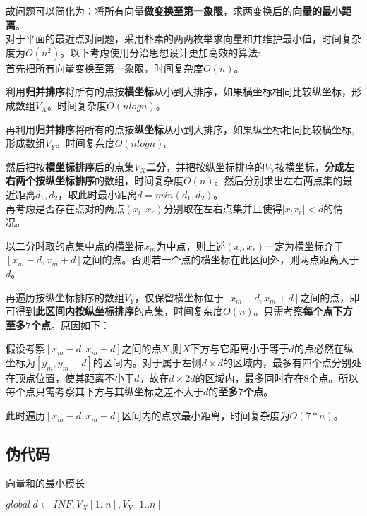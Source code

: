 \documentclass{article}
\begin{document}
故问题可以简化为：将所有向量\textbf{做变换至第一象限}，求两变换后的\textbf{向量的最小距离}。\\

对于平面的最近点对问题，采用朴素的两两枚举求向量和并维护最小值，时间复杂度为$O(n^2)$。以下考虑使用分治思想设计更加高效的算法:\\

首先把所有向量变换至第一象限，时间复杂度$O(n)$。

利用\textbf{归并排序}将所有的点按\textbf{横坐标}从小到大排序，如果横坐标相同比较纵坐标，形成数组$V_X$。时间复杂度$O(nlogn)$。

再利用\textbf{归并排序}将所有的点按\textbf{纵坐标}从小到大排序，如果纵坐标相同比较横坐标,形成数组$V_Y$。时间复杂度$O(nlogn)$。

然后把按\textbf{横坐标排序}后的点集$V_X$\textbf{二分}，并把按纵坐标排序的$V_Y$按横坐标，\textbf{分成左右两个按纵坐标排序}的数组，时间复杂度$O(n)$。然后分别求出左右两点集的最近距离$d_1,d_2$，取此时最小距离$d=min(d_1,d_2)$。\\

再考虑是否存在点对的两点$(x_l,x_r)$分别取在左右点集并且使得$|x_lx_r|<d$的情况。

以二分时取的点集中点的横坐标$x_m$为中点，则上述$(x_l,x_r)$一定为横坐标介于$[x_m-d,x_m+d]$之间的点。否则若一个点的横坐标在此区间外，则两点距离大于$d$。

再遍历按纵坐标排序的数组$V_Y$，仅保留横坐标位于$[x_m-d,x_m+d]$之间的点，即可得到\textbf{此区间内按纵坐标排序}的点集，时间复杂度$O(n)$。只需考察\textbf{每个点下方至多7个点}。原因如下：

假设考察$[x_m-d,x_m+d]$之间的点$X$,则$X$下方与它距离小于等于$d$的点必然在纵坐标为$[y_m,y_m-d]$的区间内。对于属于左侧$d\times d$的区域内，最多有四个点分别处在顶点位置，使其距离不小于$d$。故在$d\times 2d$的区域内，最多同时存在8个点。所以每个点只需考察其下方与其纵坐标之差不大于$d$的\textbf{至多7个点}。

此时遍历$[x_m-d,x_m+d]$区间内的点求最小距离，时间复杂度为$O(7*n)$。

\subsection{伪代码}
\begin{algorithm}[H]

\caption{向量和的最小模长}
\LinesNumbered
{}
$global\ d \leftarrow INF,V_X[1..n],V_Y[1..n]$\;


\end{algorithm}
\end{document}
